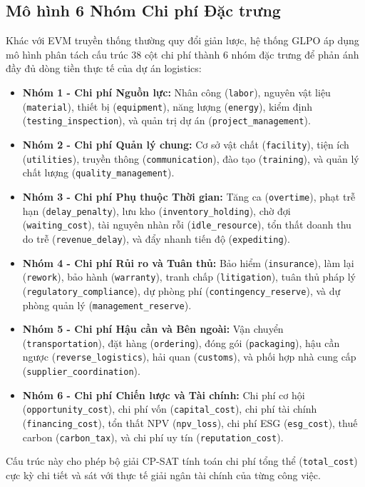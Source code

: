 \subsection{Mô hình 6 Nhóm Chi phí Đặc trưng}
Khác với EVM truyền thống thường quy đổi giản lược, hệ thống GLPO áp dụng mô hình phân tách cấu trúc 38 cột chi phí thành 6 nhóm đặc trưng để phản ánh đầy đủ dòng tiền thực tế của dự án logistics:
\begin{itemize}
    \item \textbf{Nhóm 1 - Chi phí Nguồn lực:} Nhân công (\texttt{labor}), nguyên vật liệu (\texttt{material}), thiết bị (\texttt{equipment}), năng lượng (\texttt{energy}), kiểm định (\texttt{testing\_inspection}), và quản trị dự án (\texttt{project\_management}).
    \item \textbf{Nhóm 2 - Chi phí Quản lý chung:} Cơ sở vật chất (\texttt{facility}), tiện ích (\texttt{utilities}), truyền thông (\texttt{communication}), đào tạo (\texttt{training}), và quản lý chất lượng (\texttt{quality\_management}).
    \item \textbf{Nhóm 3 - Chi phí Phụ thuộc Thời gian:} Tăng ca (\texttt{overtime}), phạt trễ hạn (\texttt{delay\_penalty}), lưu kho (\texttt{inventory\_holding}), chờ đợi (\texttt{waiting\_cost}), tài nguyên nhàn rỗi (\texttt{idle\_resource}), tổn thất doanh thu do trễ (\texttt{revenue\_delay}), và đẩy nhanh tiến độ (\texttt{expediting}).
    \item \textbf{Nhóm 4 - Chi phí Rủi ro và Tuân thủ:} Bảo hiểm (\texttt{insurance}), làm lại (\texttt{rework}), bảo hành (\texttt{warranty}), tranh chấp (\texttt{litigation}), tuân thủ pháp lý (\texttt{regulatory\_compliance}), dự phòng phí (\texttt{contingency\_reserve}), và dự phòng quản lý (\texttt{management\_reserve}).
    \item \textbf{Nhóm 5 - Chi phí Hậu cần và Bên ngoài:} Vận chuyển (\texttt{transportation}), đặt hàng (\texttt{ordering}), đóng gói (\texttt{packaging}), hậu cần ngược (\texttt{reverse\_logistics}), hải quan (\texttt{customs}), và phối hợp nhà cung cấp (\texttt{supplier\_coordination}).
    \item \textbf{Nhóm 6 - Chi phí Chiến lược và Tài chính:} Chi phí cơ hội (\texttt{opportunity\_cost}), chi phí vốn (\texttt{capital\_cost}), chi phí tài chính (\texttt{financing\_cost}), tổn thất NPV (\texttt{npv\_loss}), chi phí ESG (\texttt{esg\_cost}), thuế carbon (\texttt{carbon\_tax}), và chi phí uy tín (\texttt{reputation\_cost}).
\end{itemize}
Cấu trúc này cho phép bộ giải CP-SAT tính toán chi phí tổng thể (\texttt{total\_cost}) cực kỳ chi tiết và sát với thực tế giải ngân tài chính của từng công việc.

